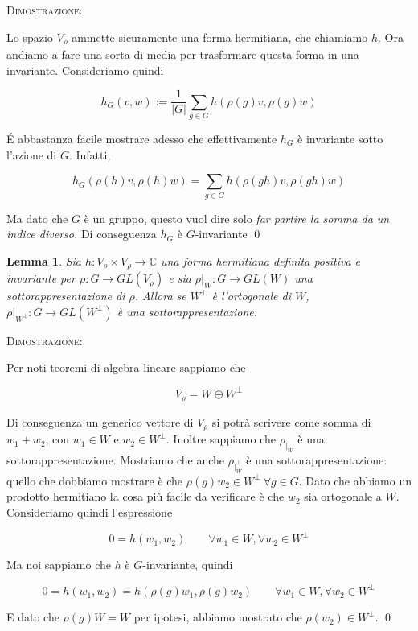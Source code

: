 \documentclass[11pt]{article}
\theoremstyle{plain}
\newtheorem{lemma}[thm]{Lemma}
\theoremstyle{definition}
\theoremstyle{remark}
\newcommand{\C}{\mathbb{C}}
\newcommand{\dsum}{\displaystyle\sum}
\begin{document}
\textsc{Dimostrazione:}

Lo spazio $V_\rho$ ammette sicuramente una forma hermitiana, che chiamiamo $h$. Ora andiamo a fare una sorta di media per trasformare questa forma in una invariante. Consideriamo quindi

\[h_G(v, w) := \dfrac{1}{|G|} \dsum_{g \in G} h(\rho(g)v,\rho(g) w) \]

\'E abbastanza facile mostrare adesso che effettivamente $h_G$ è invariante sotto l'azione di $G$. Infatti,

\[ h_G(\rho(h)v, \rho(h) w) = \dsum_{g \in G} h(\rho(gh)v , \rho(gh) w)\]

Ma dato che $G$ è un gruppo, questo vuol dire solo \emph{far partire la somma da un indice diverso.} Di conseguenza $h_G$ è $G$-invariante \qed


\begin{lemma}
Sia $h: V_\rho \times V_\rho \to \C$ una forma hermitiana definita positiva e invariante per $\rho: G \to GL(V_\rho)$ e sia $\rho|_W: G \to GL(W)$ una sottorappresentazione di $\rho$. Allora se $W^\perp$ è l'ortogonale di $W$, $\rho|_{W^\perp}: G \to GL(W^\perp)$ è una sottorappresentazione.

\end{lemma}

\textsc{Dimostrazione:}

Per noti teoremi di algebra lineare sappiamo che

\[ V_\rho = W \oplus W^\perp \]

Di conseguenza un generico vettore di $V_\rho$ si potrà scrivere come somma di $w_1 + w_2$, con $w_1 \in W$ e $w_2 \in W^\perp$. Inoltre sappiamo che $\rho_{|_W}$ è una sottorappresentazione. Mostriamo che anche $\rho_{|_W^\perp}$ è una sottorappresentazione: quello che dobbiamo mostrare è che $\rho(g) w_2 \in W^\perp \ \forall g \in G$. Dato che abbiamo un prodotto hermitiano la cosa più facile da verificare è che $w_2$ sia ortogonale a $W$. Consideriamo quindi l'espressione

\[ 0 = h(w_1, w_2) \qquad \forall w_1 \in W, \forall w_2 \in W^\perp\]

Ma noi sappiamo che $h$ è $G$-invariante, quindi

\[ 0 = h(w_1, w_2) = h(\rho(g) w_1, \rho(g) w_2) \qquad \forall w_1 \in W, \forall w_2 \in W^\perp \]

E dato che $\rho(g) W = W$ per ipotesi, abbiamo mostrato che $\rho(w_2) \in W^\perp$. \qed
\end{document}

